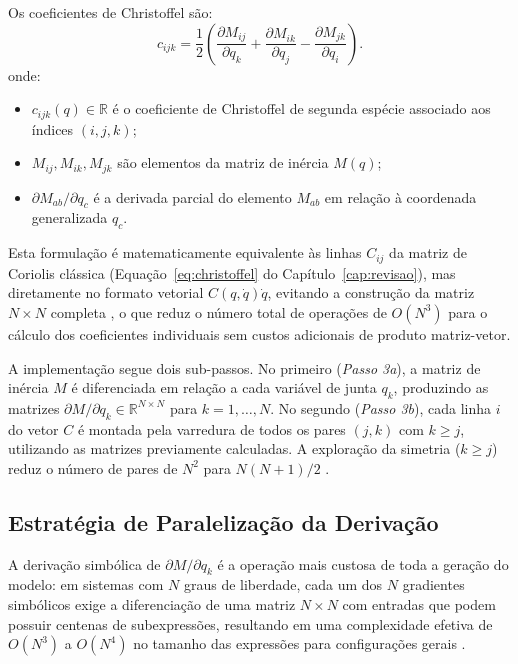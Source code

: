 Os coeficientes de Christoffel são:
\begin{equation}
    c_{ijk} = \frac{1}{2}\!\left(\frac{\partial M_{ij}}{\partial q_k} + \frac{\partial M_{ik}}{\partial q_j} - \frac{\partial M_{jk}}{\partial q_i}\right).
    \label{eq:christoffel_impl}
\end{equation}
onde:
\begin{itemize}
    \item $c_{ijk}(q) \in \mathbb{R}$ é o coeficiente de Christoffel de segunda espécie associado aos índices $(i,j,k)$;
    \item $M_{ij}, M_{ik}, M_{jk}$ são elementos da matriz de inércia $M(q)$;
    \item $\partial M_{ab}/\partial q_c$ é a derivada parcial do elemento $M_{ab}$ em relação à coordenada generalizada $q_c$.
\end{itemize}

Esta formulação é matematicamente equivalente às linhas $C_{ij}$ da matriz de Coriolis clássica (Equação~\eqref{eq:christoffel} do Capítulo~\ref{cap:revisao}), mas diretamente no formato vetorial $C(q,\dot{q})\dot{q}$, evitando a construção da matriz $N \times N$ completa , o que reduz o número total de operações de $O(N^3)$ para o cálculo dos coeficientes individuais sem custos adicionais de produto matriz-vetor.

A implementação segue dois sub-passos. No primeiro (\textit{Passo 3a}), a matriz de inércia $M$ é diferenciada em relação a cada variável de junta $q_k$, produzindo as matrizes $\partial M/\partial q_k \in \mathbb{R}^{N \times N}$ para $k = 1, \ldots, N$. No segundo (\textit{Passo 3b}), cada linha $i$ do vetor $C$ é montada pela varredura de todos os pares $(j, k)$ com $k \geq j$, utilizando as matrizes previamente calculadas. A exploração da simetria ($k \geq j$) reduz o número de pares de $N^2$ para $N(N+1)/2$ \cite{hollerbach1980recursive}.

\subsection{Estratégia de Paralelização da Derivação}

A derivação simbólica de $\partial M/\partial q_k$ é a operação mais custosa de toda a geração do modelo: em sistemas com $N$ graus de liberdade, cada um dos $N$ gradientes simbólicos exige a diferenciação de uma matriz $N \times N$ com entradas que podem possuir centenas de subexpressões, resultando em uma complexidade efetiva de $O(N^3)$ a $O(N^4)$ no tamanho das expressões para configurações gerais \cite{hollerbach1980recursive, leu1986automated}.

